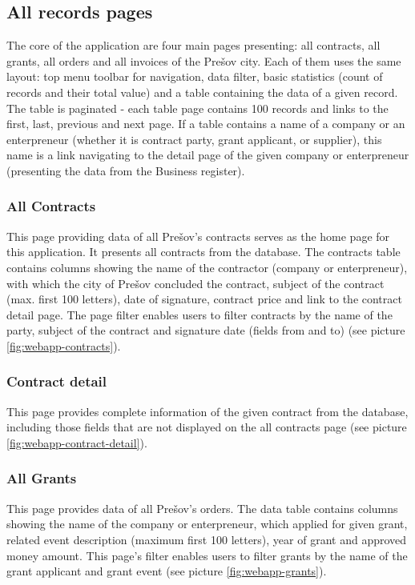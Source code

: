 \documentclass[thesis=B,english]{FITthesis}[2012/06/26]
\begin{document}
	\subsection{All records pages}
The core of the application are four main pages presenting: all contracts, all grants, all orders and all invoices of the Prešov city. Each of them uses the same layout: top menu toolbar for navigation, data filter, basic statistics (count of records and their total value) and a table containing the data of a given record. The table is paginated - each table page contains 100 records and links to the first, last, previous and next page. If a table contains a name of a company or an enterpreneur (whether it is contract party, grant applicant, or supplier), this name is a link navigating to the detail page of the given company or enterpreneur (presenting the data from the Business register).
	\subsubsection{All Contracts}
	This page providing data of all Prešov's contracts serves as the home page for this application. It presents all contracts from the database. The contracts table contains columns showing the name of the contractor (company or enterpreneur), with which the city of Prešov concluded the contract, subject of the contract (max. first 100 letters), date of signature, contract price and link to the contract detail page. The page filter enables users to filter contracts by the name of the party, subject of the contract and signature date (fields from and to) (see picture \ref{fig:webapp-contracts}).


\subsubsection{Contract detail}
	This page provides complete information of the given contract from the database, including those fields that are not displayed on the all contracts page (see picture \ref{fig:webapp-contract-detail}).


\subsubsection{All Grants}
	This page provides data of all Prešov's orders. The data table contains columns showing the name of the company or enterpreneur, which applied for given grant, related event description (maximum first 100 letters), year of grant and approved money amount. This page's filter enables users to filter grants by the name of the grant applicant and grant event (see picture \ref{fig:webapp-grants}).
\end{document}
